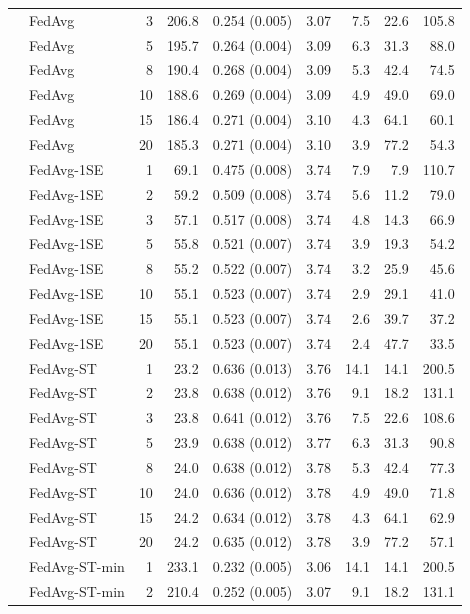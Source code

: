 \begin{longtable}{llrrrrrrr}
 & FedAvg & 3 & 206.8 & 0.254 (0.005) & 3.07 & 7.5 & 22.6 & 105.8 \\
 & FedAvg & 5 & 195.7 & 0.264 (0.004) & 3.09 & 6.3 & 31.3 & 88.0 \\
 & FedAvg & 8 & 190.4 & 0.268 (0.004) & 3.09 & 5.3 & 42.4 & 74.5 \\
 & FedAvg & 10 & 188.6 & 0.269 (0.004) & 3.09 & 4.9 & 49.0 & 69.0 \\
 & FedAvg & 15 & 186.4 & 0.271 (0.004) & 3.10 & 4.3 & 64.1 & 60.1 \\
 & FedAvg & 20 & 185.3 & 0.271 (0.004) & 3.10 & 3.9 & 77.2 & 54.3 \\
 & FedAvg-1SE & 1 & 69.1 & 0.475 (0.008) & 3.74 & 7.9 & 7.9 & 110.7 \\
 & FedAvg-1SE & 2 & 59.2 & 0.509 (0.008) & 3.74 & 5.6 & 11.2 & 79.0 \\
 & FedAvg-1SE & 3 & 57.1 & 0.517 (0.008) & 3.74 & 4.8 & 14.3 & 66.9 \\
 & FedAvg-1SE & 5 & 55.8 & 0.521 (0.007) & 3.74 & 3.9 & 19.3 & 54.2 \\
 & FedAvg-1SE & 8 & 55.2 & 0.522 (0.007) & 3.74 & 3.2 & 25.9 & 45.6 \\
 & FedAvg-1SE & 10 & 55.1 & 0.523 (0.007) & 3.74 & 2.9 & 29.1 & 41.0 \\
 & FedAvg-1SE & 15 & 55.1 & 0.523 (0.007) & 3.74 & 2.6 & 39.7 & 37.2 \\
 & FedAvg-1SE & 20 & 55.1 & 0.523 (0.007) & 3.74 & 2.4 & 47.7 & 33.5 \\
 & FedAvg-ST & 1 & 23.2 & 0.636 (0.013) & 3.76 & 14.1 & 14.1 & 200.5 \\
 & FedAvg-ST & 2 & 23.8 & 0.638 (0.012) & 3.76 & 9.1 & 18.2 & 131.1 \\
 & FedAvg-ST & 3 & 23.8 & 0.641 (0.012) & 3.76 & 7.5 & 22.6 & 108.6 \\
 & FedAvg-ST & 5 & 23.9 & 0.638 (0.012) & 3.77 & 6.3 & 31.3 & 90.8 \\
 & FedAvg-ST & 8 & 24.0 & 0.638 (0.012) & 3.78 & 5.3 & 42.4 & 77.3 \\
 & FedAvg-ST & 10 & 24.0 & 0.636 (0.012) & 3.78 & 4.9 & 49.0 & 71.8 \\
 & FedAvg-ST & 15 & 24.2 & 0.634 (0.012) & 3.78 & 4.3 & 64.1 & 62.9 \\
 & FedAvg-ST & 20 & 24.2 & 0.635 (0.012) & 3.78 & 3.9 & 77.2 & 57.1 \\
 & FedAvg-ST-min & 1 & 233.1 & 0.232 (0.005) & 3.06 & 14.1 & 14.1 & 200.5 \\
 & FedAvg-ST-min & 2 & 210.4 & 0.252 (0.005) & 3.07 & 9.1 & 18.2 & 131.1 \\

\end{longtable}
